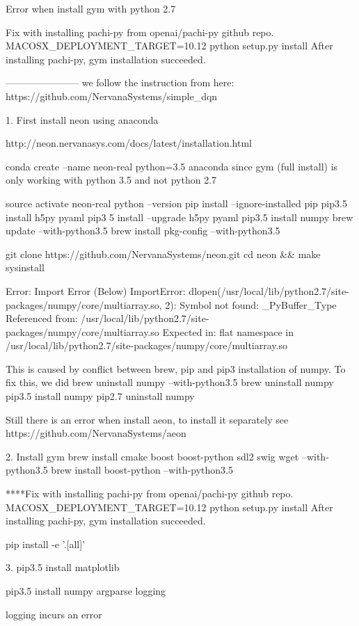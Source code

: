 Error when install gym with python 2.7

Fix with installing pachi-py from openai/pachi-py github repo.
MACOSX_DEPLOYMENT_TARGET=10.12 python setup.py install
After installing pachi-py, gym installation succeeded.

-----------------------
we follow the instruction from here:
https://github.com/NervanaSystems/simple_dqn

1.  First install neon using anaconda

http://neon.nervanasys.com/docs/latest/installation.html

conda create --name neon-real python=3.5 anaconda
since gym (full install) is only working with python 3.5 and not python 2.7

source activate neon-real
python --version
pip install --ignore-installed pip
pip3.5 install h5py pyaml
pip3 5 install --upgrade h5py pyaml
pip3.5 install numpy
brew update --with-python3.5
brew install pkg-config --with-python3.5

git clone https://github.com/NervanaSystems/neon.git
cd neon && make sysinstall

Error: Import Error (Below)
ImportError: dlopen(/usr/local/lib/python2.7/site-packages/numpy/core/multiarray.so, 2): Symbol not found: _PyBuffer_Type
      Referenced from: /usr/local/lib/python2.7/site-packages/numpy/core/multiarray.so
      Expected in: flat namespace
     in /usr/local/lib/python2.7/site-packages/numpy/core/multiarray.so

This is caused by conflict between brew, pip and pip3 installation of numpy.
To fix this, we did
brew uninstall numpy --with-python3.5
brew uninstall numpy
pip3.5 install numpy
pip2.7 uninstall numpy

Still there is an error when install aeon, to install it separately see
https://github.com/NervanaSystems/aeon


2. Install gym
brew install cmake boost boost-python sdl2 swig wget --with-python3.5
brew install boost-python --with-python3.5

****Fix with installing pachi-py from openai/pachi-py github repo.
MACOSX_DEPLOYMENT_TARGET=10.12 python setup.py install
After installing pachi-py, gym installation succeeded.

pip install -e '.[all]'

3. 
pip3.5 install matplotlib

pip3.5 install numpy argparse logging

logging incurs an error

